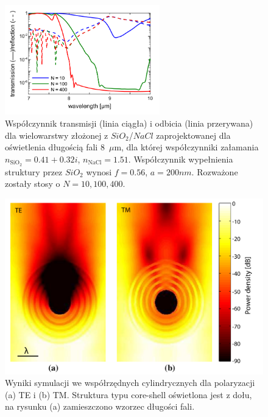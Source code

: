 \begin{figure}[tb]
	\centering
	\includegraphics[width=0.6\textwidth]{images/pml/oqe_trans_refl.png}
	\caption{Współczynnik transmisji (linia ciągła) i odbicia (linia przerywana) dla wielowarstwy złożonej z $SiO_2$/$NaCl$ zaprojektowanej dla oświetlenia długością fali 8~$\mu$m, dla której współczynniki załamania $n_{\textrm{SiO}_2}=0.41+0.32i$, $n_{\textrm{NaCl}}=1.51$. Współczynnik wypełnienia struktury przez $SiO_2$ wynosi $f=0.56$, $a=200nm$. Rozważone zostały stosy o $N=10,100,400$.}
	\label{fig:oqe-trans-refl}
\end{figure}

\begin{figure}[tb]
	\includegraphics[width=\textwidth]{images/pml/oqe_coreshell.png}
	\caption{Wyniki symulacji we współrzędnych cylindrycznych dla polaryzacji (a) TE i (b) TM. Struktura typu core-shell oświetlona jest z dołu, na rysunku (a) zamieszczono wzorzec długości fali.}
\end{figure}


